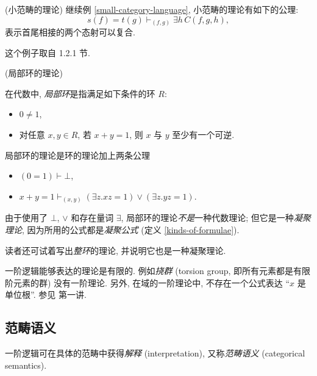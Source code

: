 %    

\begin{example}
	{(小范畴的理论)}
	继续例 \ref{small-category-language}, 小范畴的理论有如下的公理:
	$$
	s(f)=t(g)\vdash_{(f,g)}\exists h\, C(f,g,h),
	$$
	表示首尾相接的两个态射可以复合.
	
	这个例子取自 \cite{TST} 1.2.1 节.
\end{example}

\begin{example}
	{(局部环的理论)}
	
	在代数中, \emph{局部环}是指满足如下条件的环 $R$:
	\begin{itemize}
		\item $0\neq 1$,
		\item 对任意 $x,y\in R$, 若 $x+y=1$, 则 $x$ 与 $y$ 至少有一个可逆.
	\end{itemize}
	
	局部环的理论是环的理论加上两条公理
	\begin{itemize}
		\item $(0=1)\vdash \bot$,
		\item $x+y=1\vdash_{(x,y)} (\exists z. xz=1)\vee (\exists z. yz=1)$.
	\end{itemize}
	
	由于使用了 $\bot$, $\vee$ 和存在量词 $\exists$, 局部环的理论\emph{不是}一种代数理论; 但它是一种\emph{凝聚理论}, 因为所用的公式都是\emph{凝聚公式} (定义 \ref{kinds-of-formulae}).
	
	读者还可试着写出\emph{整环}的理论, 并说明它也是一种凝聚理论.
\end{example}

\begin{remark}
	{}
	一阶逻辑能够表达的理论是有限的. 例如\emph{挠群} (torsion group, 即所有元素都是有限阶元素的群) 没有一阶理论.
	另外, 在域的一阶理论中, 不存在一个公式表达 ``$x$ 是单位根''. 参见 \cite{Lurie-Categorical-Logic} 第一讲.
\end{remark}

\subsection{范畴语义}

一阶逻辑可在具体的范畴中获得\emph{解释} (interpretation), 又称\emph{范畴语义} (categorical semantics).

